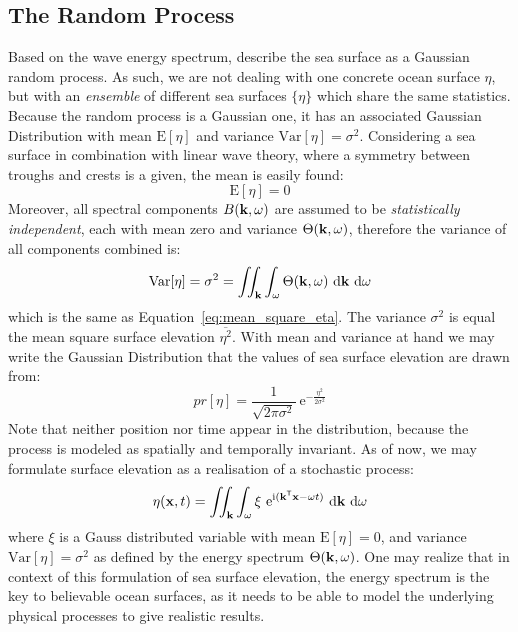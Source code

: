\subsection{The Random Process}
\label{sec:random_process}
Based on the wave energy spectrum, \citet{Neumann:1966} describe the sea surface
as a Gaussian random process.
As such, we are not dealing with one concrete ocean surface $\eta$, but with an
\emph{ensemble} of different sea surfaces $\{\eta\}$ which share the same
statistics. Because the random process is a
Gaussian one, it has an associated Gaussian Distribution with mean
$\mathrm{E}[\eta]$ and variance $\mathrm{Var}[\eta] = \sigma^2$. Considering a
sea surface in combination with linear wave theory, where a symmetry between
troughs and crests is a given, the mean is easily found:
\begin{equation*}
 \mathrm{E}[\eta] = 0
\end{equation*}
%
Moreover, all spectral components $B(\mathbf{k},\omega)$ are assumed to be
\emph{statistically independent}, each with mean zero and variance $\Theta(\mathbf{k},\omega)$,
therefore the variance of all components combined is:
\begin{equation*}
\label{eq:random_process_variance}
\mathrm{Var}[\eta] = \sigma^2 = \iint_{\mathbf{k}}
\int_{\omega}\Theta(\mathbf{k},\omega)~\mathrm{d}\mathbf{k}~\mathrm{ d}\omega
\end{equation*}
which is the same as Equation~\ref{eq:mean_square_eta}. The variance
$\sigma^2$ is equal the mean square surface elevation $\overline{\eta^2}$. With
mean and variance at hand we may write the Gaussian Distribution that the
values of sea surface elevation are drawn from:
\begin{equation}
\label{eq:gaussian_dist}
 pr[\eta] = \frac{1}{\sqrt{2\pi\sigma^2}}~\mathrm{e}^{-\frac{\eta^2}{2\sigma^2}}
\end{equation}
Note that neither position nor time appear in the distribution, because the
process is modeled as spatially and temporally invariant.
As of now, we may formulate surface elevation as a realisation of a stochastic process:
\begin{equation}
\label{eq:surface_elevation_gauss}
 \eta(\mathbf{x}, t) = \iint_{\mathbf{k}}\int_{\omega} \xi
~\mathrm{e}^{\mathrm{i}(\mathbf{k}^{\mathsf{T}}\mathbf{x}-
\omega t)}~
\mathrm{d}\mathbf{k}~\mathrm{d}\omega
\end{equation}
where $\xi$ is a Gauss distributed variable with mean $\mathrm{E}[\eta] = 0$,
and variance $\mathrm{Var}[\eta] = \sigma^2$ as defined by the energy spectrum
$\Theta(\mathbf{k}, \omega)$. One may realize that in context of this formulation
of sea surface elevation, the energy spectrum is the key to believable
ocean surfaces, as it needs to be able to model the underlying physical
processes to give realistic results.\\

